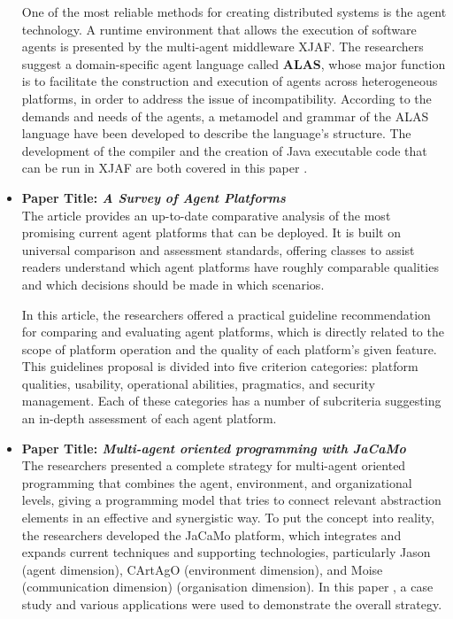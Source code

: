 \begin{itemize}[label={}]
One of the most reliable methods for creating distributed systems is the agent technology. A runtime environment that allows the execution of software agents is presented by the multi-agent middleware XJAF. The researchers suggest a domain-specific agent language called \textbf{ALAS}, whose major function is to facilitate the construction and execution of agents across heterogeneous platforms, in order to address the issue of incompatibility. According to the demands and needs of the agents, a metamodel and grammar of the ALAS language have been developed to describe the language's structure. The development of the compiler and the creation of Java executable code that can be run in XJAF are both covered in this paper \cite{xtext}.

\vspace{.5cm}

\item \textbf{Paper Title: \textit{A Survey of Agent Platforms}}\\

The article \cite{survey} provides an up-to-date comparative analysis of the most promising current agent platforms that can be deployed. It is built on universal comparison and assessment standards, offering classes to assist readers understand which agent platforms have roughly comparable qualities and which decisions should be made in which scenarios.

\vspace{.5cm}

In this article, the researchers offered a practical guideline recommendation for comparing and evaluating agent platforms, which is directly related to the scope of platform operation and the quality of each platform's given feature. This guidelines proposal is divided into five criterion categories: platform qualities, usability, operational abilities, pragmatics, and security management. Each of these categories has a number of subcriteria suggesting an in-depth assessment of each agent platform.

\vspace{.5cm}

\item \textbf{Paper Title: \textit{Multi-agent oriented programming with JaCaMo}}\\

The researchers presented a complete strategy for multi-agent oriented programming that combines the agent, environment, and organizational levels, giving a programming model that tries to connect relevant abstraction elements in an effective and synergistic way. To put the concept into reality, the researchers developed the JaCaMo platform, which integrates and expands current techniques and supporting technologies, particularly Jason (agent dimension), CArtAgO (environment dimension), and Moise (communication dimension) (organisation dimension).  In this paper \cite{Jacamo}, a case study and various applications were used to demonstrate the overall strategy.


\end{itemize}
